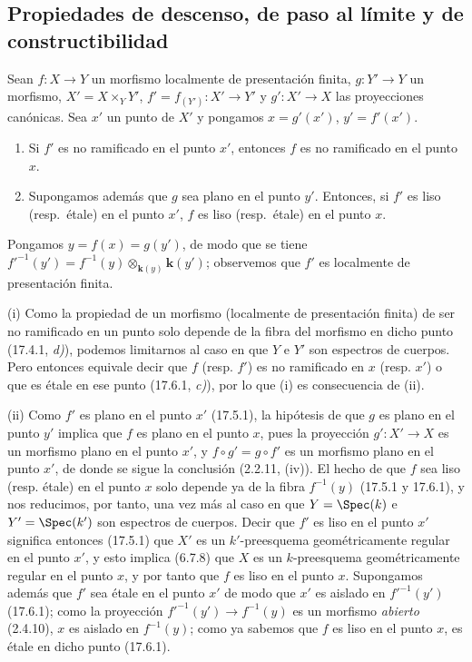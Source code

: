 \subsection{Propiedades de descenso, de paso al límite y de constructibilidad}
\label{subsection:IV.17.7}
\label{IV.17.7}

\begin{proposition}[17.7.1]
\label{IV.17.7.1}
Sean $f:X\to Y$ un morfismo localmente de presentación finita, $g:Y'\to Y$ un morfismo, $X'=X\times_Y Y'$, $f'=f_{(Y')}:X'\to Y'$ y $g':X'\to X$ las proyecciones canónicas. Sea $x'$ un punto de $X'$ y pongamos $x=g'(x')$, $y'=f'(x')$.
\begin{enumerate}
  \item[\textup{(i)}] Si $f'$ es no ramificado en el punto $x'$, entonces $f$ es no ramificado en el punto $x$.
  \item[\textup{(ii)}] Supongamos además que $g$ sea plano en el punto $y'$. Entonces, si $f'$ es liso \textup{(resp.}\ étale\textup{)} en el punto $x'$, $f$ es liso \textup{(resp.}\ étale\textup{)} en el punto $x$.
\end{enumerate}
\end{proposition}

Pongamos $y=f(x)=g(y')$, de modo que se tiene $f'^{-1}(y')=f^{-1}(y)\otimes_{\mathbf k(y)}\boldsymbol k(y')$; observemos que $f'$ es localmente de presentación finita.

(i) Como la propiedad de un morfismo (localmente de presentación finita) de ser no ramificado en un punto solo depende de la fibra del morfismo en dicho punto (17.4.1, \emph{d)}), podemos limitarnos al caso en que $Y$ e $Y'$ son espectros de cuerpos. Pero entonces equivale decir que $f$ (resp. $f'$) es no ramificado en $x$ (resp. $x'$) o que es étale en ese punto (17.6.1, \emph{c)}), por lo que (i) es consecuencia de (ii).

(ii) Como $f'$ es plano en el punto $x'$ (17.5.1), la hipótesis de que $g$ es plano en el punto $y'$ implica que $f$ es plano en el punto $x$, pues la proyección $g':X'\to X$ es un morfismo plano en el punto $x'$, y $f\circ g'=g\circ f'$ es un morfismo plano en el punto $x'$, de donde se sigue la conclusión (2.2.11, (iv)). El hecho de que $f$ sea liso (resp. étale) en el punto $x$ solo depende ya de la fibra $f^{-1}(y)$ (17.5.1 y 17.6.1), y nos reducimos, por tanto, una vez más al caso en que $Y=\Spec(k)$ e $Y'=\Spec(k')$ son espectros de cuerpos. Decir que $f'$ es liso en el punto $x'$ significa entonces (17.5.1) que $X'$ es un $k'$-preesquema geométricamente regular en el punto $x'$, y esto implica (6.7.8) que $X$ es un $k$-preesquema geométricamente regular en el punto $x$, y por tanto que $f$ es liso en el punto $x$. Supongamos además que $f'$ sea étale en el punto $x'$ de modo que $x'$ es aislado en $f'^{-1}(y')$ (17.6.1); como la proyección $f'^{-1}(y')\to f^{-1}(y)$ es un morfismo \emph{abierto} (2.4.10), $x$ es aislado en $f^{-1}(y)$; como ya sabemos que $f$ es liso en el punto $x$, es étale en dicho punto (17.6.1).

